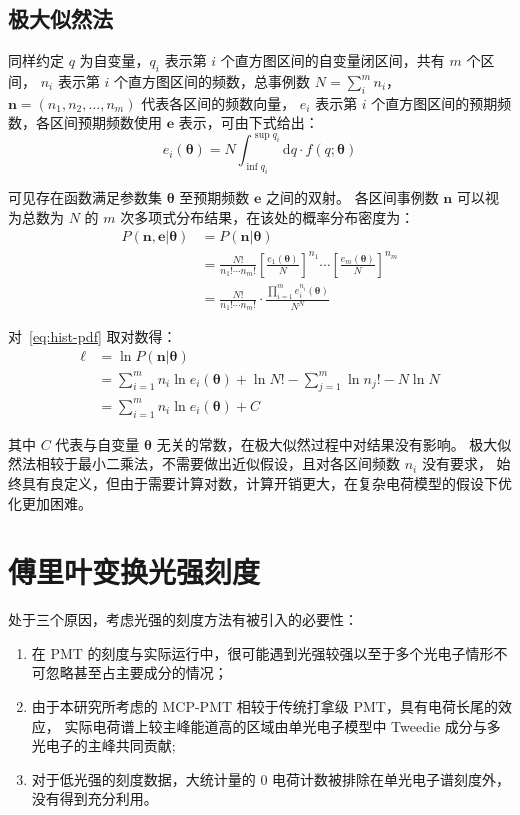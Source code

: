 \subsection{极大似然法}
同样约定 $q$ 为自变量，$q_i$ 表示第 $i$ 个直方图区间的自变量闭区间，共有 $m$ 个区间，
$n_i$ 表示第 $i$ 个直方图区间的频数，总事例数 $N=\sum_{i}^{m}n_i$，$\boldsymbol{n}=(n_1, n_2, \ldots, n_m)$ 代表各区间的频数向量，
$e_i$ 表示第 $i$ 个直方图区间的预期频数，各区间预期频数使用 $\boldsymbol{e}$ 表示，可由下式给出：
\begin{equation}
    e_i(\boldsymbol{\theta}) = N\int_{\inf q_i}^{\sup q_i}\mathrm{d}q\cdot f(q;\boldsymbol{\theta})
    \label{eq:ei}
\end{equation}

可见存在函数满足参数集 $\boldsymbol{\theta}$ 至预期频数 $\boldsymbol{e}$ 之间的双射。
各区间事例数 $\boldsymbol{n}$ 可以视为总数为 $N$ 的 $m$ 次多项式分布结果，在该处的概率分布密度为：
\begin{align}
    P(\boldsymbol{n},\boldsymbol{e}|\boldsymbol{\theta})
    &=P(\boldsymbol{n}|\boldsymbol{\theta})\\
    &=\frac{N!}{n_1!\cdots n_m!}\left[\frac{e_1(\boldsymbol{\theta})}{N}\right]^{n_1}
    \cdots\left[\frac{e_m(\boldsymbol{\theta})}{N}\right]^{n_m}\\
    &=\frac{N!}{n_1!\cdots n_m!}\cdot\frac{\prod_{i=1}^{m}e_i^{n_i}(\boldsymbol{\theta})}{N^N}
    \label{eq:hist-pdf}
\end{align}

对~\eqref{eq:hist-pdf} 取对数得：
\begin{align}
    \ell&=\ln P(\boldsymbol{n}|\boldsymbol{\theta})\\
    &=\sum_{i=1}^{m}n_i\ln{e_i(\boldsymbol{\theta})}
    +\ln{N!}-\sum_{j=1}^{m}\ln{n_j!}-N\ln{N}\\
    &=\sum_{i=1}^{m}n_i\ln{e_i(\boldsymbol{\theta})}+C
    \label{eq:log-l}
\end{align}

其中 $C$ 代表与自变量 $\boldsymbol{\theta}$ 无关的常数，在极大似然过程中对结果没有影响。
极大似然法相较于最小二乘法，不需要做出近似假设，且对各区间频数 $n_i$ 没有要求，
始终具有良定义，但由于需要计算对数，计算开销更大，在复杂电荷模型的假设下优化更加困难。

\section{傅里叶变换光强刻度}

处于三个原因，考虑光强的刻度方法有被引入的必要性：
\begin{enumerate}
    \item 在 PMT 的刻度与实际运行中，很可能遇到光强较强以至于多个光电子情形不可忽略甚至占主要成分的情况；
    \item 由于本研究所考虑的 MCP-PMT 相较于传统打拿级 PMT，具有电荷长尾的效应，
    实际电荷谱上较主峰能道高的区域由单光电子模型中 Tweedie 成分与多光电子的主峰共同贡献;
    \item 对于低光强的刻度数据，大统计量的 0 电荷计数被排除在单光电子谱刻度外，没有得到充分利用。
\end{enumerate}

